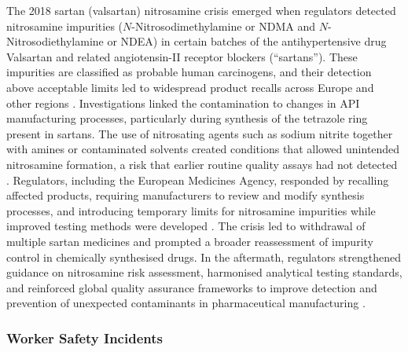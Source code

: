 The 2018 sartan (valsartan) nitrosamine crisis emerged when regulators detected nitrosamine impurities ($N$-Nitrosodimethylamine or NDMA and $N$-Nitrosodiethylamine or NDEA) in certain batches of the antihypertensive drug Valsartan and related angiotensin-II receptor blockers (``sartans''). These impurities are classified as probable human carcinogens, and their detection above acceptable limits led to widespread product recalls across Europe and other regions \cite{Wichitnithad_2023, EMA_Nitrosamine}. Investigations linked the contamination to changes in API manufacturing processes, particularly during synthesis of the tetrazole ring present in sartans. The use of nitrosating agents such as sodium nitrite together with amines or contaminated solvents created conditions that allowed unintended nitrosamine formation, a risk that earlier routine quality assays had not detected \cite{Wichitnithad_2023, Lowe_Sartan}. Regulators, including the European Medicines Agency, responded by recalling affected products, requiring manufacturers to review and modify synthesis processes, and introducing temporary limits for nitrosamine impurities while improved testing methods were developed \cite{EMA_Nitrosamine}. The crisis led to withdrawal of multiple sartan medicines and prompted a broader reassessment of impurity control in chemically synthesised drugs. In the aftermath, regulators strengthened guidance on nitrosamine risk assessment, harmonised analytical testing standards, and reinforced global quality assurance frameworks to improve detection and prevention of unexpected contaminants in pharmaceutical manufacturing \cite{EMA_Nitrosamine, Lowe_Sartan}.

\subsubsection{Worker Safety Incidents}

